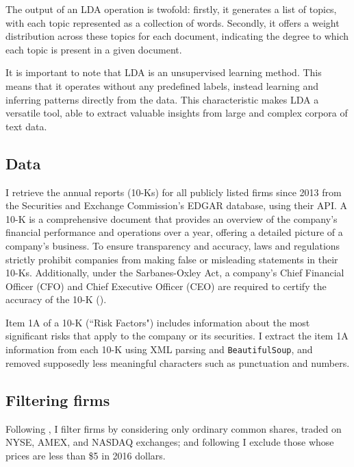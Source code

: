 \documentclass[12pt, letterpaper]{article}
\begin{document}
The output of an LDA operation is twofold: firstly, it generates a list of topics, with each topic represented as a collection of words. Secondly, it offers a weight distribution across these topics for each document, indicating the degree to which each topic is present in a given document.

It is important to note that LDA is an unsupervised learning method. This means that it operates without any predefined labels, instead learning and inferring patterns directly from the data. This characteristic makes LDA a versatile tool, able to extract valuable insights from large and complex corpora of text data.

\subsection{Data}

I retrieve the annual reports (10-Ks) for all publicly listed firms since 2013 from the Securities and Exchange Commission's EDGAR database, using their API. A 10-K is a comprehensive document that provides an overview of the company's financial performance and operations over a year, offering a detailed picture of a company's business.  To ensure transparency and accuracy, laws and regulations strictly prohibit companies from making false or misleading statements in their 10-Ks. Additionally, under the Sarbanes-Oxley Act, a company's Chief Financial Officer (CFO) and Chief Executive Officer (CEO) are required to certify the accuracy of the 10-K (\cite{SEC_Office_of_Investor_Education_and_Advocacy2011-tw}).

Item 1A of a 10-K (``Risk Factors") includes information about the most significant risks that apply to the company or its securities.  I extract the item 1A information from each 10-K using XML parsing and \texttt{BeautifulSoup}, and removed supposedly less meaningful characters such as punctuation and numbers.

\subsection{Filtering firms}

Following \cite{Golubov2019-ku, Stambaugh2016-eb}, I filter firms by considering only ordinary common shares, traded on NYSE, AMEX, and NASDAQ exchanges; and following \cite{Stambaugh2016-eb} I exclude those whose prices are less than \$5 in 2016 dollars. 
\end{document}
